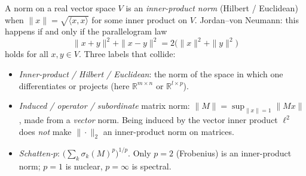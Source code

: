 \documentclass[11pt,a4paper]{article}
\begin{document}
\begin{remark}
\label{rem:inner-product-norms}
A norm on a real vector space \(V\) is an \emph{inner-product norm} (Hilbert / Euclidean) when \(\|x\|=\sqrt{\langle x,x\rangle}\) for some inner product on \(V\). Jordan--von Neumann: this happens if and only if the parallelogram law
\[
\|x+y\|^{2}+\|x-y\|^{2}
=
2\bigl(\|x\|^{2}+\|y\|^{2}\bigr)
\]
holds for all \(x,y\in V\). Three labels that collide:
\begin{itemize}[leftmargin=1.4em]
    \item
    \emph{Inner-product / Hilbert / Euclidean}: the norm of the space in which one differentiates or projects (here \(\mathbb{R}^{m\times n}\) or \(\mathbb{R}^{l\times p}\)).
    \item
    \emph{Induced / operator / subordinate} matrix norm: \(\|M\|=\sup_{\|x\|=1}\|Mx\|\), made from a \emph{vector} norm. Being induced by the vector inner product \(\ell^{2}\) does \emph{not} make \(\|\cdot\|_{2}\) an inner-product norm on matrices.
    \item
    \emph{Schatten-\(p\)}: \(\bigl(\sum_{k}\sigma_{k}(M)^{p}\bigr)^{1/p}\). Only \(p=2\) (Frobenius) is an inner-product norm; \(p=1\) is nuclear, \(p=\infty\) is spectral.
\end{itemize}


\end{remark}
\end{document}
